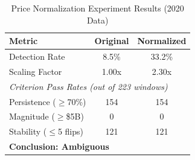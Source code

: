 \begin{table}[t]
\centering
\caption{Price Normalization Experiment Results (2020 Data)}
\label{tab:price_normalization}
\begin{tabular}{lcc}
\hline
\textbf{Metric} & \textbf{Original} & \textbf{Normalized} \\
\hline
Detection Rate & 8.5\% & 33.2\% \\
Scaling Factor & 1.00x & 2.30x \\
\hline
\multicolumn{3}{l}{\textit{Criterion Pass Rates (out of 223 windows)}} \\
\hline
Persistence ($\geq$70\%) & 154 & 154 \\
Magnitude ($\geq$\$5B) & 0 & 0 \\
Stability ($\leq$5 flips) & 121 & 121 \\
\hline
\multicolumn{3}{l}{\textbf{Conclusion: Ambiguous}} \\
\hline
\end{tabular}
\end{table}
